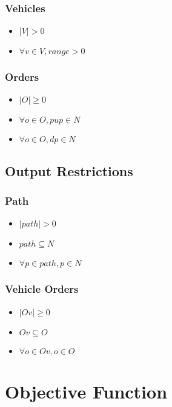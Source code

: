 \subsubsection{Vehicles}
\begin{itemize}
    \item $ |V| > 0 $
    \item $ \forall v \in V, range > 0 $
\end{itemize}

\subsubsection{Orders}
\begin{itemize}
    \item $ |O| \geq 0 $
    \item $ \forall o \in O, pup \in N $
    \item $ \forall o \in O, dp \in N $
\end{itemize}


\subsection{Output Restrictions}

\subsubsection{Path}
\begin{itemize}
    \item $ |path| > 0 $
    \item $ path \subseteq N $
    \item $ \forall p \in path, p \in N $
\end{itemize}

\subsubsection{Vehicle Orders}
\begin{itemize}
    \item $ |Ov| \geq 0 $
    \item $ Ov \subseteq O $
    \item $ \forall o \in Ov, o \in O$
\end{itemize}



\section{Objective Function}

